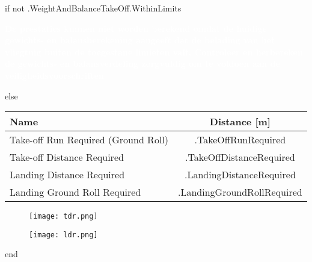 \documentclass[12pt]{article}
\begin{document}
{{ if not .WeightAndBalanceTakeOff.WithinLimits }}
{\small
\noindent
\colorbox{red!80}{%
\parbox{\textwidth}{%
\centering
{\textcolor{white}{\textbf{
De prestaties kunnen niet worden berekend omdat de huidige gewichts- en balansberekening aangeeft dat de belading van het vliegtuig buiten de toegestane limieten valt. Controleer en herbereken de gewichts- en balansverdeling zorgvuldig om te voldoen aan de veiligheidsvoorschriften
}}}%
}%
}
}
{{ else }}
{\small
\begin{table}[H]
\centering
\renewcommand{\arraystretch}{1.5}
\setlength{\tabcolsep}{10pt}
\begin{tabular}{|l|c|}
\hline
\rowcolor[HTML]{AAAAAA}
\textbf{Name} & \textbf{Distance [m]} \\ \hline
Take-off Run Required (Ground Roll) & {{ .TakeOffRunRequired }} \\ \hline
Take-off Distance Required & {{ .TakeOffDistanceRequired }} \\ \hline
Landing Distance Required & {{ .LandingDistanceRequired }} \\ \hline
Landing Ground Roll Required & {{ .LandingGroundRollRequired }} \\ \hline
\end{tabular}
\end{table}
}

\newpage
\begin{figure}[H]
\centering
\texttt{[image: tdr.png]}
\end{figure}

\begin{figure}[H]
\centering
\texttt{[image: ldr.png]}
\end{figure}
{{ end }}
\end{document}
